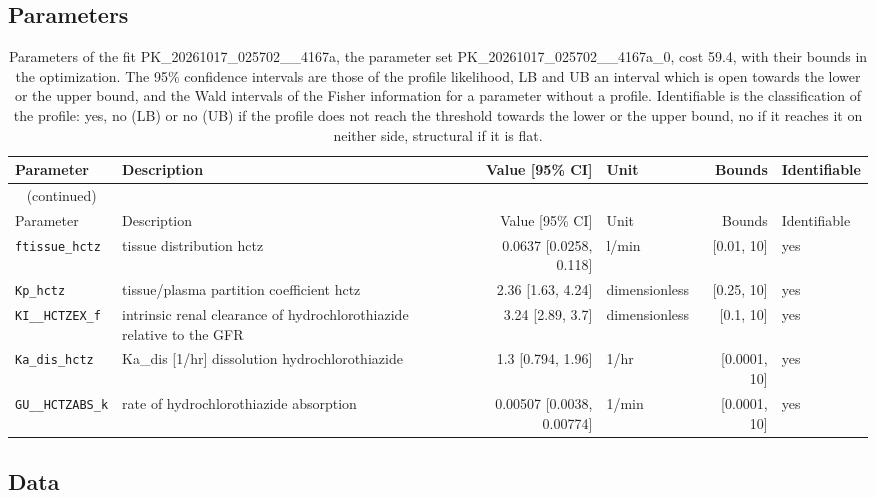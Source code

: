 \documentclass{article}
\begin{document}
\subsection{Parameters}

\begin{longtable}{llrlrl}
\caption{Parameters of the fit PK\_20261017\_025702\_\_4167a, the parameter set PK\_20261017\_025702\_\_4167a\_0, cost 59.4, with their bounds in the optimization. The 95\% confidence intervals are those of the profile likelihood, LB and UB an interval which is open towards the lower or the upper bound, and the Wald intervals of the Fisher information for a parameter without a profile. Identifiable is the classification of the profile: yes, no (LB) or no (UB) if the profile does not reach the threshold towards the lower or the upper bound, no if it reaches it on neither side, structural if it is flat.}\label{tab:parameters:PK_20261017_025702__4167a} \\
\toprule
Parameter & Description & Value [95\% CI] & Unit & Bounds & Identifiable \\
\midrule
\endfirsthead
\multicolumn{6}{l}{\small\tablename~\thetable{} (continued)} \\
\toprule
Parameter & Description & Value [95\% CI] & Unit & Bounds & Identifiable \\
\midrule
\endhead
\bottomrule
\endlastfoot
\texttt{ftissue\_hctz} & tissue distribution hctz & 0.0637 [0.0258, 0.118] & l/min & [0.01, 10] & yes \\
\texttt{Kp\_hctz} & tissue/plasma partition coefficient hctz & 2.36 [1.63, 4.24] & dimensionless & [0.25, 10] & yes \\
\texttt{KI\_\_HCTZEX\_f} & intrinsic renal clearance of hydrochlorothiazide relative to the GFR & 3.24 [2.89, 3.7] & dimensionless & [0.1, 10] & yes \\
\texttt{Ka\_dis\_hctz} & Ka\_dis [1/hr] dissolution hydrochlorothiazide & 1.3 [0.794, 1.96] & 1/hr & [0.0001, 10] & yes \\
\texttt{GU\_\_HCTZABS\_k} & rate of hydrochlorothiazide absorption & 0.00507 [0.0038, 0.00774] & 1/min & [0.0001, 10] & yes \\
\end{longtable}

\subsection{Data}
\end{document}
